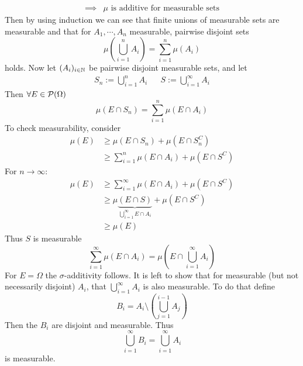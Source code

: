 \documentclass[../../script.tex]{subfiles}
\begin{document}
\begin{thm}
\begin{subequations}
\begin{align}
            \implies &\mu \text{ is additive for measurable sets}
        \end{align}
    \end{subequations}
    Then by using induction we can see that finite unions of measurable sets are measurable and that for $A_1, \cdots, A_n$ measurable, pairwise disjoint sets 
    \begin{equation}
        \mu\left(\bigcup_{i=1}^n A_i\right) = \sum_{i=1}^n \mu(A_i)
    \end{equation}
    holds. Now let $(A_i)_{i \in \mathbb{N}}$ be pairwise disjoint measurable sets, and let 
    \begin{align}
        S_n := \bigcup_{i=1}^n A_i && S := \bigcup_{i=1}^{\infty} A_i
    \end{align}
    Then $\forall E \in \mathcal{P}(\Omega)$
    \begin{equation}
        \mu(E \cap S_n) = \sum_{i=1}^n \mu(E \cap A_i)
    \end{equation}
    To check measurability, consider 
    \begin{equation}
        \begin{split}
            \mu(E) &\ge \mu(E \cap S_n) + \mu(E \cap S_n^C) \\
            &\ge \sum_{i=1}^n \mu(E \cap A_i) + \mu(E \cap S^C)
        \end{split}
    \end{equation}
    For $n \rightarrow \infty$:
    \begin{equation}
        \begin{split}
            \mu(E) &\ge \sum_{i=1}^{\infty} \mu(E \cap A_i) + \mu(E \cap S^C) \\
            &\ge \mu\underbrace{(E \cap S)}_{\bigcup_{i=1}^{\infty} E \cap A_i} + \mu(E \cap S^C) \\
            &\ge \mu(E)
        \end{split}
    \end{equation}
    Thus $S$ is measurable 
    \begin{equation}
        \sum_{i=1}^{\infty} \mu(E \cap A_i) = \mu\left(E \cap \bigcup_{i=1}^{\infty} A_i\right)
    \end{equation}
    For $E = \Omega$ the $\sigma$-additivity follows. 
    It is left to show that for measurable (but not necessarily disjoint) $A_i$, that $\bigcup_{i=1}^{\infty} A_i$ is also measurable.
    To do that define 
    \begin{equation}
        B_i = A_i \setminus \left(\bigcup_{j=1}^{i-1} A_j \right) 
    \end{equation}
    Then the $B_i$ are disjoint and measurable. Thus 
    \begin{equation}
        \bigcup_{i=1}^{\infty} B_i = \bigcup_{i=1}^{\infty} A_i
    \end{equation}
    is measurable.
\end{thm}
\end{document}
